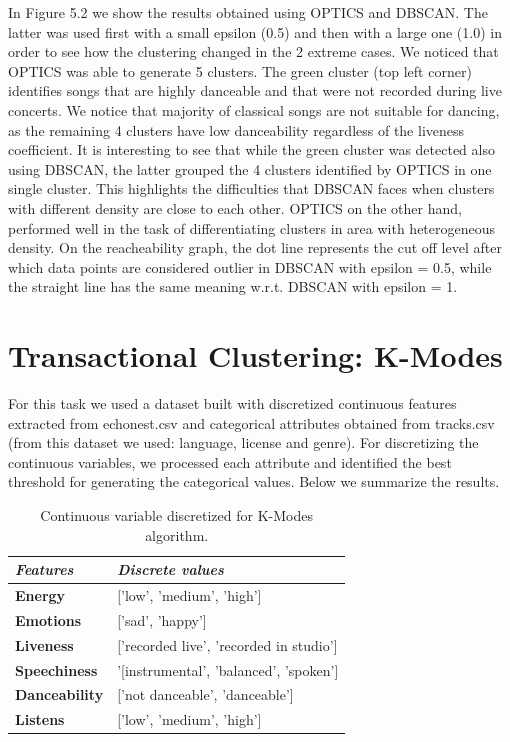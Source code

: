 In Figure 5.2 we show the results obtained using OPTICS and DBSCAN. The latter was used first with a small epsilon (0.5) and then with a large one (1.0) in order to see how the clustering changed in the 2 extreme cases.
We noticed that OPTICS was able to generate 5 clusters. The green cluster (top left corner) identifies songs that are highly danceable and that were not recorded during live concerts. We notice that majority of classical songs are not suitable for dancing, as the remaining 4 clusters have low danceability regardless of the liveness coefficient. It is interesting to see that while the green cluster was detected also using DBSCAN, the latter grouped the 4 clusters identified by OPTICS in one single cluster. This highlights the difficulties that DBSCAN faces when clusters with different density are close to each other. OPTICS on the other hand, performed well in the task of differentiating clusters in area with heterogeneous density.
On the reacheability graph, the dot line represents the cut off level after which data points are considered outlier in DBSCAN with epsilon = 0.5, while the straight line has the same meaning w.r.t. DBSCAN with epsilon = 1. 

\section{Transactional Clustering: K-Modes}

For this task we used a dataset built with discretized continuous features extracted from echonest.csv and categorical attributes obtained from tracks.csv (from this dataset we used: language, license and genre). For discretizing the continuous variables, we processed each attribute and identified the best threshold for generating the categorical values. Below we summarize the results. 

\begin{table}[htb!]
\centering
\begin{tabular}{ll}
\hline
\textit{\textbf{Features}} & \textit{\textbf{Discrete values}}           \\ \hline
\textbf{Energy}            & {[}'low', 'medium', 'high'{]}               \\ \hline
\textbf{Emotions}           & {[}'sad', 'happy'{]}                        \\ \hline
\textbf{Liveness}          & {[}'recorded live', 'recorded in studio'{]} \\ \hline
\textbf{Speechiness}       & '{[}instrumental', 'balanced', 'spoken'{]}  \\ \hline
\textbf{Danceability}      & {[}'not danceable', 'danceable'{]}          \\ \hline
\textbf{Listens}           & {[}'low', 'medium', 'high'{]}               \\ \hline
\end{tabular}
\caption{Continuous variable discretized for K-Modes algorithm.}
\label{tab:my-table}
\end{table}

